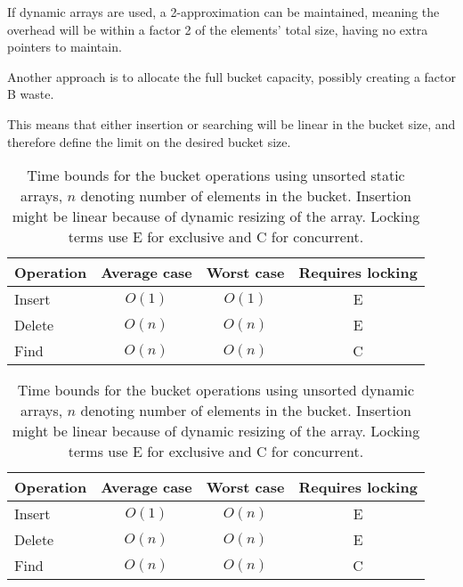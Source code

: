 If dynamic arrays are used, a 2-approximation can be maintained, meaning the
overhead will be within a factor 2 of the elements' total size, having no
extra pointers to maintain.

Another approach is to allocate the full bucket capacity, possibly creating a
factor B waste.

This means that either insertion or searching will be linear in the bucket
size, and therefore define the limit on the desired bucket size.

\begin{table}[h!]
    \centering
    \begin{tabular}[here]{ l || c | c | c}
        Operation & Average case & Worst case & Requires locking  \\ \hline
        Insert    & $O(1)$ & $O(1)$ & E \\ \hline
        Delete    & $O(n)$ & $O(n)$ & E \\ \hline
        Find      & $O(n)$ & $O(n)$ & C  \\ \hline
    \end{tabular}
    \caption{Time bounds for the bucket operations using unsorted static
    arrays, $n$ denoting number of elements in the bucket. Insertion might be
    linear because of dynamic resizing of the array. Locking terms use E for
        exclusive and C for concurrent.}
    \label{tab:bounds:unsortedarray}
\end{table}
\begin{table}[h!]
    \centering
    \begin{tabular}[here]{ l || c | c | c}
        Operation & Average case & Worst case & Requires locking  \\ \hline
        Insert    & $O(1)$ & $O(n)$ & E \\ \hline
        Delete    & $O(n)$ & $O(n)$ & E \\ \hline
        Find      & $O(n)$ & $O(n)$ & C  \\ \hline
    \end{tabular}
    \caption{Time bounds for the bucket operations using unsorted dynamic
    arrays, $n$ denoting number of elements in the bucket. Insertion might be
    linear because of dynamic resizing of the array. Locking terms use E for
        exclusive and C for concurrent.}
    \label{tab:bounds:unsorteddynarray}
\end{table}
